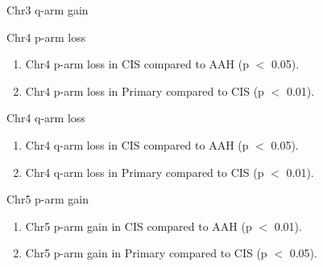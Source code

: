 \documentclass{beamer}
\begin{document}
\begin{frame}[allowframebreaks]
\begin{block}{Chr3 q-arm gain}
                    \begin{table}
                        \caption{CGC Tier1 genes in Chr3 q-arm}
                        \resizebox{\linewidth}{!}
                        {}
                    \end{table}
                \end{block}

                \begin{block}{Chr4 p-arm loss}
                    \begin{enumerate}
                        \item Chr4 p-arm loss in CIS compared to AAH (p $<$ 0.05).
                        \item Chr4 p-arm loss in Primary compared to CIS (p $<$ 0.01).
                    \end{enumerate}

                    \begin{table}
                        \caption{CGC Tier1 genes in Chr4 p-arm}
                        \resizebox{\linewidth}{!}
                        {}
                    \end{table}
                \end{block}

                \begin{block}{Chr4 q-arm loss}
                    \begin{enumerate}
                        \item Chr4 q-arm loss in CIS compared to AAH (p $<$ 0.05).
                        \item Chr4 q-arm loss in Primary compared to CIS (p $<$ 0.01).
                    \end{enumerate}

                    \begin{table}
                        \caption{CGC Tier1 genes in Chr4 q-arm}
                        \resizebox{\linewidth}{!}
                        {}
                    \end{table}
                \end{block}

                \begin{block}{Chr5 p-arm gain}
                    \begin{enumerate}
                        \item Chr5 p-arm gain in CIS compared to AAH (p $<$ 0.01).
                        \item Chr5 p-arm gain in Primary compared to CIS (p $<$ 0.05).
                    \end{enumerate}


\end{block}
\end{frame}
\end{document}
